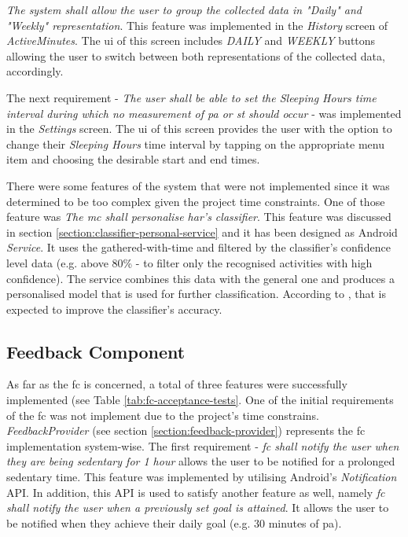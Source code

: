 \textit{The system shall allow the user to group the collected data in "Daily" and "Weekly" representation}. This feature was implemented in the \textit{History} screen of \textit{ActiveMinutes}. The \gls{ui} of this screen includes \textit{DAILY} and \textit{WEEKLY} buttons allowing the user to switch between both representations of the collected data, accordingly.

The next requirement - \textit{The user shall be able to set the \textit{Sleeping Hours} time interval during which no measurement of \gls{pa} or \gls{st} should occur} - was implemented in the \textit{Settings} screen. The \gls{ui} of this screen provides the user with the option to change their \textit{Sleeping Hours} time interval by tapping on the appropriate menu item and choosing the desirable start and end times.

There were some features of the system that were not implemented since it was determined to be too complex given the project time constraints. One of those feature was \textit{The \gls{mc} shall personalise \gls{har}'s classifier}. This feature was discussed in section \ref{section:classifier-personal-service} and it has been designed as Android \textit{Service}. It uses the gathered-with-time and filtered by the classifier's confidence level data (e.g. above 80\% - to filter only the recognised activities with high confidence). The service combines this data with the general one and produces a personalised model that is used for further classification. According to \citet[376]{arapakis_athanasakos_jose_2010}, that is expected to improve the classifier's accuracy.


\subsection{Feedback Component}
As far as the \gls{fc} is concerned, a total of three features were successfully implemented (see Table \ref{tab:fc-acceptance-tests}. One of the initial requirements of the \gls{fc} was not implement due to the project's time constrains. \textit{FeedbackProvider} (see section \ref{section:feedback-provider}) represents the \gls{fc} implementation system-wise. The first requirement - \textit{\gls{fc} shall notify the user when they are being sedentary for 1 hour} allows the user to be notified for a prolonged sedentary time. This feature was implemented by utilising Android's \textit{Notification} API. In addition, this API is used to satisfy another feature as well, namely \textit{\gls{fc} shall notify the user when a previously set goal is attained}. It allows the user to be notified when they achieve their daily goal (e.g. 30 minutes of \gls{pa}).

